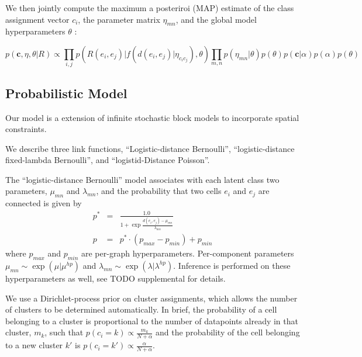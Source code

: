 \documentclass{article}
\renewcommand{\vec}[1]{\mathbf{#1}}
\begin{document}
We then jointly compute the maximum a posteriroi (MAP) estimate of the
class assignment vector ${c_i}$, the parameter matrix $\eta_{mn}$, and
the global model hyperparameters $\theta$ :

\begin{equation}
  p(\vec{c}, \eta, \theta | R ) \propto \prod_{i, j} p(R(e_i, e_j) | f(d(e_i, e_j) | \eta_{c_ic_j}), \theta) \prod_{m, n} p(\eta_{mn} | \theta)  p(\theta) p(\vec{c} | \alpha) p(\alpha) p(\theta)
\end{equation}



\subsection{Probabilistic Model}

Our model is a extension of infinite stochastic block models
\autocite{Kemp2006a,Xu2006} to incorporate spatial constraints.


We describe three link functions, ``Logistic-distance Bernoulli'',
``logistic-distance fixed-lambda Bernoulli'', and ``logistid-Distance
Poisson''. 

The ``logistic-distance Bernoulli'' model associates with each latent class 
two parameters, $\mu_{mn}$ and $\lambda_{mn}$, and the probability that two
cells $e_i$ and $e_j$ are connected is given by
\begin{eqnarray}
p^* &=& \frac{1.0}{1 + \exp \frac{d(e_i, e_j) - \mu_{mn}}{\lambda_{mn}}}\\
p &= & p^* \cdot (p_{max} - p_{min}) + p_{min}
\end{eqnarray}
where $p_{max}$ and $p_{min}$ are per-graph hyperparameters. Per-component parameters $\mu_{mn} \sim \exp(\mu | \mu^{hp})$ and $\lambda_{mn} \sim \exp(\lambda | \lambda^{hp})$. 
Inference is performed on these hyperparameters as well, see TODO supplemental 
for details. 

We use a Dirichlet-process prior on cluster assignments, which allows
the number of clusters to be determined automatically. In brief, the
probability of a cell belonging to a cluster is proportional to the
number of datapoints already in that cluster, $m_k$, such that $p(c_i
= k) \propto \frac{m_k}{N + \alpha}$ and the probability of the cell
belonging to a new cluster $k'$ is $p(c_i = k') \propto
\frac{\alpha}{N + \alpha}$.
\end{document}
